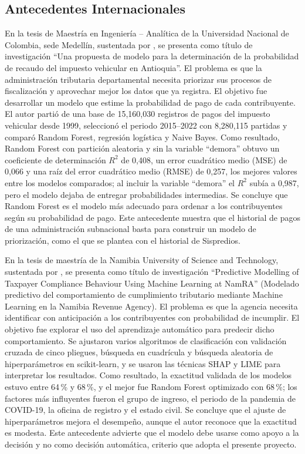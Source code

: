 \documentclass[12pt,a4paper]{report}
\begin{document}
\subsection{Antecedentes Internacionales}

En la tesis de Maestría en Ingeniería -- Analítica de la Universidad Nacional de Colombia, sede Medellín, sustentada por \textcite{orozco2023}, se presenta como título de investigación ``Una propuesta de modelo para la determinación de la probabilidad de recaudo del impuesto vehicular en Antioquia''. El problema es que la administración tributaria departamental necesita priorizar sus procesos de fiscalización y aprovechar mejor los datos que ya registra. El objetivo fue desarrollar un modelo que estime la probabilidad de pago de cada contribuyente. El autor partió de una base de 15,160,030 registros de pagos del impuesto vehicular desde 1999, seleccionó el periodo 2015--2022 con 8,280,115 partidas y comparó Random Forest, regresión logística y Naive Bayes. Como resultado, Random Forest con partición aleatoria y sin la variable ``demora'' obtuvo un coeficiente de determinación $R^2$ de 0,408, un error cuadrático medio (MSE) de 0,066 y una raíz del error cuadrático medio (RMSE) de 0,257, los mejores valores entre los modelos comparados; al incluir la variable ``demora'' el $R^2$ subía a 0,987, pero el modelo dejaba de entregar probabilidades intermedias. Se concluye que Random Forest es el modelo más adecuado para ordenar a los contribuyentes según su probabilidad de pago. Este antecedente muestra que el historial de pagos de una administración subnacional basta para construir un modelo de priorización, como el que se plantea con el historial de Sispredios.

En la tesis de maestría de la Namibia University of Science and Technology, sustentada por \textcite{sifani2025}, se presenta como título de investigación ``Predictive Modelling of Taxpayer Compliance Behaviour Using Machine Learning at NamRA'' (Modelado predictivo del comportamiento de cumplimiento tributario mediante Machine Learning en la Namibia Revenue Agency). El problema es que la agencia necesita identificar con anticipación a los contribuyentes con probabilidad de incumplir. El objetivo fue explorar el uso del aprendizaje automático para predecir dicho comportamiento. Se ajustaron varios algoritmos de clasificación con validación cruzada de cinco pliegues, búsqueda en cuadrícula y búsqueda aleatoria de hiperparámetros en scikit-learn, y se usaron las técnicas SHAP y LIME para interpretar los resultados. Como resultado, la exactitud validada de los modelos estuvo entre 64\,\% y 68\,\%, y el mejor fue Random Forest optimizado con 68\,\%; los factores más influyentes fueron el grupo de ingreso, el periodo de la pandemia de COVID-19, la oficina de registro y el estado civil. Se concluye que el ajuste de hiperparámetros mejora el desempeño, aunque el autor reconoce que la exactitud es modesta. Este antecedente advierte que el modelo debe usarse como apoyo a la decisión y no como decisión automática, criterio que adopta el presente proyecto.
\end{document}
